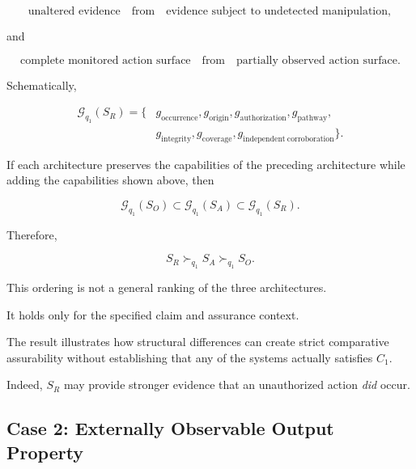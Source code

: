 \begin{equation}
  \text{unaltered evidence}
  \quad\text{from}\quad
  \text{evidence subject to undetected manipulation},
\end{equation}

and

\begin{equation}
  \text{complete monitored action surface}
  \quad\text{from}\quad
  \text{partially observed action surface}.
\end{equation}

Schematically,

\begin{equation}
  \begin{aligned}
    \mathcal{G}_{q_1}(S_R)
    =
    \{ &
    g_{\mathrm{occurrence}},
    g_{\mathrm{origin}},
    g_{\mathrm{authorization}},
    g_{\mathrm{pathway}}, \\
       &
    g_{\mathrm{integrity}},
    g_{\mathrm{coverage}},
    g_{\mathrm{independent\ corroboration}}
    \}.
  \end{aligned}
\end{equation}

If each architecture preserves the capabilities of the preceding
architecture while adding the capabilities shown above, then

\begin{equation}
  \mathcal{G}_{q_1}(S_O)
  \subset
  \mathcal{G}_{q_1}(S_A)
  \subset
  \mathcal{G}_{q_1}(S_R).
\end{equation}

Therefore,

\begin{equation}
  S_R
  \succ_{q_1}
  S_A
  \succ_{q_1}
  S_O.
  \label{eq:case1-order}
\end{equation}

This ordering is not a general ranking of the three architectures.

It holds only for the specified claim and assurance context.

The result illustrates how structural differences can create strict
comparative assurability without establishing that any of the systems
actually satisfies \(C_1\).

Indeed, \(S_R\) may provide stronger evidence that an unauthorized action
\emph{did} occur.

\subsection{Case 2: Externally Observable Output Property}
\label{aa.subsec.case-output-property}

